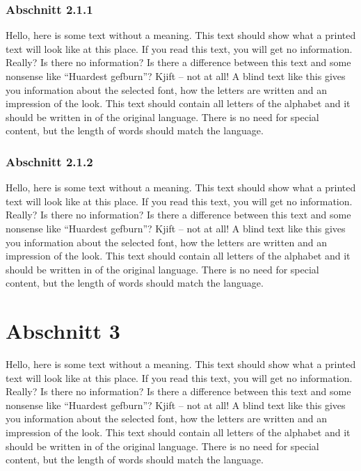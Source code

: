 \subsubsection{Abschnitt 2.1.1}\label{Abschnitt211}
Hello, here is some text without a meaning. This text should show what a printed text will look like at this place. If you read this text, you will get no information. Really? Is there no information? Is there a difference between this text and some nonsense like “Huardest gefburn”? Kjift – not at all! A blind text like this gives you information about the selected font, how the letters are written and an impression of the look. This text should contain all letters of the alphabet and it should be written in of the original language. There is no need for special content, but the length of words should match the language.

\subsubsection{Abschnitt 2.1.2}\label{Abschnitt212}
Hello, here is some text without a meaning. This text should show what a printed text will look like at this place. If you read this text, you will get no information. Really? Is there no information? Is there a difference between this text and some nonsense like “Huardest gefburn”? Kjift – not at all! A blind text like this gives you information about the selected font, how the letters are written and an impression of the look. This text should contain all letters of the alphabet and it should be written in of the original language. There is no need for special content, but the length of words should match the language.

\newpage

\section{Abschnitt 3}\label{Abschnitt3}
Hello, here is some text without a meaning. This text should show what a printed text will look like at this place. If you read this text, you will get no information. Really? Is there no information? Is there a difference between this text and some nonsense like “Huardest gefburn”? Kjift – not at all! A blind text like this gives you information about the selected font, how the letters are written and an impression of the look. This text should contain all letters of the alphabet and it should be written in of the original language. There is no need for special content, but the length of words should match the language.

